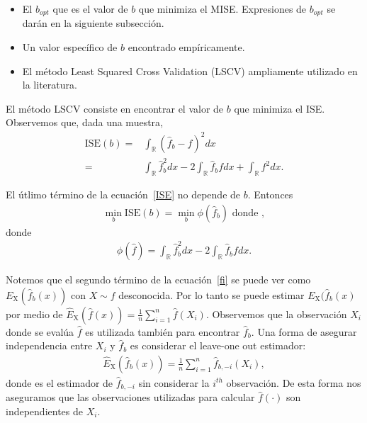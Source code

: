 \begin{itemize}
	\item El $b_{opt}$ que es el valor de $b$ que minimiza el MISE. Expresiones de $b_{opt}$ se darán en la siguiente subsección.
	\item Un valor específico de $b$ encontrado empíricamente.
	\item El método Least Squared Cross Validation (LSCV) ampliamente utilizado en la literatura.
\end{itemize}


El método LSCV consiste en encontrar el valor de $b$ que minimiza el ISE. Observemos que, dada una muestra,
\begin{align}
\label{ISE}
	\text{ISE}(b)=&\int_\mathbb{R} (\widehat{f}_b-f)^2 dx \nonumber\\ 
	=& \int_\mathbb{R} \widehat{f}_b^2dx- 2 \int_\mathbb{R} \widehat{f}_b fdx +\int_\mathbb{R} f^2dx.
\end{align}

El útlimo término de la ecuación~\eqref{ISE} no depende de $b$. Entonces
\begin{align}
	\nonumber \min_b \text{ISE}(b)= \min_b \phi(\widehat{f}_b) \text{ donde } ,
\end{align}
donde
\begin{align}
\label{fi}
\phi(\widehat{f})=\int_\mathbb{R} \widehat{f}_b^2 dx- 2 \int_\mathbb{R} \widehat{f}_b fdx.
\end{align}

Notemos que el segundo término de la ecuación~\eqref{fi} se puede ver como $E_\text{X}(\widehat{f}_b(x))$ con $X \sim f$ desconocida. Por lo tanto se puede estimar $E_\text{X}(\widehat{f}_b(x)$ por medio de $\hat{E}_\text{X}(\widehat{f}(x))=\frac{1}{n}\sum_{i=1}^n \widehat{f}(X_i)$. Observemos que la observación $X_i$ donde se evalúa $\widehat{f}$ es utilizada también para encontrar $\widehat{f}_b$. Una forma de asegurar independencia entre $X_i$ y  $\widehat{f}_b$ es considerar el leave-one out estimador:
\begin{align}
\hat{E}_\text{X}(\widehat{f}_b(x))=\frac{1}{n}\sum_{i=1}^n \widehat{f}_{b,-i}(X_i),
\end{align}	
donde  es el estimador de $\widehat{f}_{b,-i}$ sin considerar la $i^{th}$ observación. De esta forma nos aseguramos que las observaciones utilizadas para calcular  $\widehat{f}(\cdot)$ son independientes de $X_i.$

